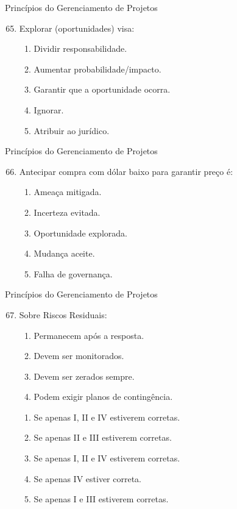 \documentclass{beamer}
\begin{document}
\begin{frame}{Princípios do Gerenciamento de Projetos}
	\begin{enumerate}
		\setcounter{enumi}{64}
		\justifying
		\item Explorar (oportunidades) visa:
		\begin{enumerate}[a]
			\item Dividir responsabilidade.
			\item Aumentar probabilidade/impacto.
			\item \alert<2>{Garantir que a oportunidade ocorra.}
			\item Ignorar.
			\item Atribuir ao jurídico.
		\end{enumerate}
	\end{enumerate}
\end{frame}

\begin{frame}{Princípios do Gerenciamento de Projetos}
	\begin{enumerate}
		\setcounter{enumi}{65}
		\justifying
		\item Antecipar compra com dólar baixo para garantir preço é:
		\begin{enumerate}[a]
			\item Ameaça mitigada.
			\item Incerteza evitada.
			\item \alert<2>{Oportunidade explorada.}
			\item Mudança aceite.
			\item Falha de governança.
		\end{enumerate}
	\end{enumerate}
\end{frame}

\begin{frame}{Princípios do Gerenciamento de Projetos}
	\begin{enumerate}
		\setcounter{enumi}{66}
		\justifying
		\item Sobre Riscos Residuais:
		\begin{enumerate}[I]
			\item Permanecem após a resposta.
			\item Devem ser monitorados.
			\item Devem ser zerados sempre.
			\item Podem exigir planos de contingência.
		\end{enumerate}
		\begin{enumerate}[a]
			\item Se apenas I, II e IV estiverem corretas.
			\item Se apenas II e III estiverem corretas.
			\item \alert<2>{Se apenas I, II e IV estiverem corretas.}
			\item Se apenas IV estiver correta.
			\item Se apenas I e III estiverem corretas.
		\end{enumerate}
	\end{enumerate}
\end{frame}
\end{document}
